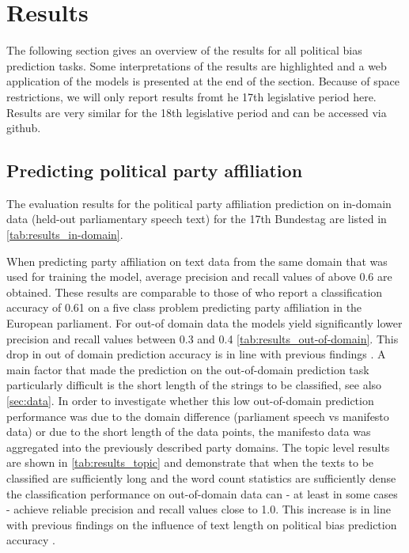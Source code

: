 \documentclass[11pt]{article}
\begin{document}
\section{Results}\label{sec:results}

The following section gives an overview of the results for all political bias prediction tasks. Some interpretations of the results are highlighted and a web application of the models is presented at the end of the section. Because of space restrictions, we will only report results fromt he 17th legislative period here. Results are very similar for the 18th legislative period and can be accessed via github.

\subsection{Predicting political party affiliation}
The evaluation results for the political party affiliation prediction on in-domain data (held-out parliamentary speech text) for the 17th Bundestag are listed in \autoref{tab:results_in-domain}.

When predicting party affiliation on text data from the same domain that was used for training the model, average precision and recall values of above 0.6 are obtained. These results are comparable to those of \cite{Hirst2014} who report a classification accuracy of 0.61 on a five class problem predicting party affiliation in the European parliament.
For out-of domain data the models yield significantly lower precision and recall values between 0.3 and 0.4 \autoref{tab:results_out-of-domain}. This drop in out of domain prediction accuracy is in line with previous findings \cite{Yu2008}.
A main factor that made the prediction on the out-of-domain prediction task particularly difficult is the short length of the strings to be classified, see also \autoref{sec:data}. In order to investigate whether this low out-of-domain prediction performance was due to the domain difference (parliament speech vs manifesto data) or due to the short length of the data points, the manifesto data was aggregated into the previously described party domains. The topic level results are shown in \autoref{tab:results_topic} and demonstrate that when the texts to be classified are sufficiently long and the word count statistics are sufficiently dense the classification performance on out-of-domain data can - at least in some cases - achieve reliable precision and recall values close to 1.0. This increase is in line with previous findings on the influence of text length on political bias prediction accuracy \cite{Hirst2014}.
\end{document}
